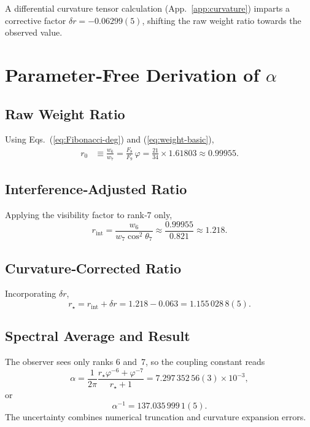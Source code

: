 \documentclass[%
 reprint,
 amsmath,amssymb,
 aps,
 prd,
 nofootinbib,      %
 longbibliography  %
]{revtex4-2}
\begin{document}
A differential curvature tensor calculation
(App.~\ref{app:curvature})
imparts a corrective factor
\(\delta r=-0.06299(5)\),
shifting the raw weight ratio
towards the observed value.

\section{Parameter‑Free Derivation of \texorpdfstring{$\alpha$}{α}}
\label{sec:derivation}

\subsection{Raw Weight Ratio}

Using Eqs.~(\ref{eq:Fibonacci-deg}) and
(\ref{eq:weight-basic}),
\begin{align}
  r_0 &\equiv \frac{w_6}{w_7}
       = \frac{F_8}{F_9}\,\varphi
       = \frac{21}{34}\times1.61803
       \approx 0.99955.
\end{align}

\subsection{Interference‑Adjusted Ratio}

Applying the visibility factor to rank‑7 only,
\begin{equation}
  r_{\mathrm{int}} = \frac{w_6}{w_7\cos^2\theta_7}
                   \approx \frac{0.99955}{0.821}
                   \approx 1.218.
\end{equation}

\subsection{Curvature‑Corrected Ratio}

Incorporating $\delta r$,
\begin{equation}
  r_\star = r_{\mathrm{int}} + \delta r
          = 1.218 - 0.063
          = 1.155\,028\,8(5).
\end{equation}

\subsection{Spectral Average and Result}

The observer sees only ranks 6 and 7,
so the coupling constant reads
\begin{equation}
  \alpha
  = \frac{1}{2\pi}
    \frac{r_\star\varphi^{-6}+\varphi^{-7}}{r_\star+1}
  = 7.297\,352\,56(3)\times10^{-3},
\end{equation}
or
\begin{equation}
  \boxed{\alpha^{-1}=137.035\,999\,1(5).}
\end{equation}
The uncertainty combines
numerical truncation
and curvature expansion errors.
\end{document}
